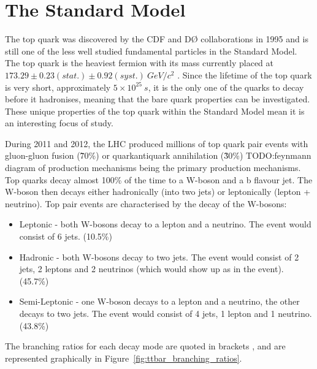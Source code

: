 \chapter{The Standard Model}
\label{c:the_standard_model}

The top quark was discovered by the CDF and D{\O} collaborations in 1995 and is still one of the less
well studied fundamental particles in the Standard Model. The top quark is the heaviest fermion with its mass
currently placed at $173.29 \pm 0.23 (stat.) \pm 0.92 (syst.)~GeV/c^{2}$ \cite{top_mass}. Since the lifetime
of the top quark is very short, approximately $5 \times 10^{25}~s$, it is the only one of the quarks to decay
before it hadronises, meaning that the bare quark properties can be investigated. These unique properties of
the top quark within the Standard Model mean it is an interesting focus of study.

During 2011 and 2012, the LHC produced millions of top quark pair events with gluon-gluon fusion (\~70\%) or
quark\-anti\-quark annihilation (\~30\%) TODO:feynmann diagram of production mechanisms %
being the primary production mechanisms. Top quarks decay almost 100\% of the time to a W-boson and a b
flavour jet. The W-boson then decays either hadronically (into two jets) or leptonically (lepton + neutrino).
Top pair events are characterised by the decay of the W-bosons:
\begin{itemize}
  \item Leptonic - both W-bosons decay to a lepton and a neutrino. The event would consist of 6 jets. (10.5\%)
  \item Hadronic - both W-bosons decay to two jets. The event would consist of 2 jets, 2 leptons and 2
  neutrinos (which would show up as \met in the event). (45.7\%)
  \item Semi-Leptonic - one W-boson decays to a lepton and a neutrino, the other decays to two jets. The
  event would consist of 4 jets, 1 lepton and 1 neutrino. (43.8\%)
\end{itemize}

The branching ratios for each decay mode are quoted in brackets \cite{PDG}, and are represented graphically in
Figure~\ref{fig:ttbar_branching_ratios}.

